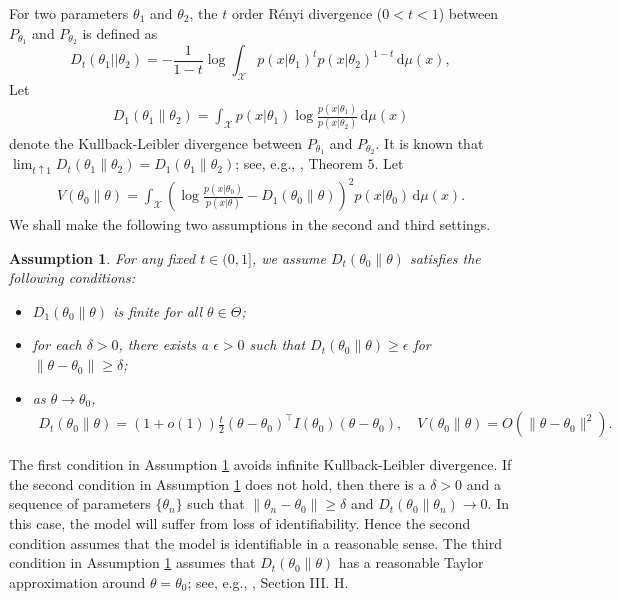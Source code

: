\documentclass[11pt]{article}
\newcommand{\myT}{\intercal}
\theoremstyle{plain}
\newtheorem{assumption}{\quad\quad Assumption}
\theoremstyle{definition}
\theoremstyle{remark}
\begin{document}
 For two parameters $\theta_1$ and $\theta_2$, the $t$ order R\'{e}nyi divergence ($0<t <1$) between $P_{\theta_1}$ and $P_{\theta_2}$ is defined as
$$
D_{t}(\theta_1||\theta_2)=-\frac{1}{1-t}\log 
\int_{\mathcal{X}} p(x|\theta_1)^{t} p(x|\theta_2)^{1-t} \, \mathrm d \mu (x)
,
$$
Let 
\begin{align*}
    D_1(\theta_1 \| \theta_2) = \int_{\mathcal X} p( x |\theta_1) \log \frac{p(x | \theta_1)} { p( x | \theta_2) } \, \mathrm d \mu (x)
\end{align*}
denote the Kullback-Leibler divergence between $P_{\theta_1}$ and $P_{\theta_2}$.
It is known that $\lim_{t \uparrow 1} D_t(\theta_1 \| \theta_2) = D_1 (\theta_1 \| \theta_2)$; see, e.g., \cite{Erven2014}, Theorem $5$.
Let 
\begin{align*}
    V(\theta_0 \| \theta) = \int_{\mathcal X} \left( \log \frac{p(x|\theta_0)} { p(x | \theta) }  - D_1 (\theta_0 \| \theta) \right)^2  p( x |\theta_0) \, \mathrm d \mu (x).
\end{align*}
We shall make the following two assumptions in the second and third settings.
\begin{assumption}
    For any fixed $t \in (0,1]$,
    we assume $D_t\left( \theta_0 \| \theta \right)$ satisfies the following conditions:
    \begin{itemize}
        \item 
    $D_1(\theta_0 \| \theta)$ is finite for all $\theta \in \Theta$;
\item
    for each $\delta >0$,
    there exists a $\epsilon>0$ such that $D_t\left( \theta_0 \| \theta \right)\geq \epsilon$ for $\|\theta-\theta_0\| \geq \delta$;
\item
    as $\theta \to \theta_0$, 
    \begin{align*}
        D_t(\theta_0 \| \theta) = (1+o(1))\frac{t}{2} (\theta -\theta_0)^\myT I(\theta_0) (\theta - \theta_0),\quad
        V(\theta_0 \| \theta ) = O\left( \|\theta - \theta_0\|^2 \right)
        .
    \end{align*}
    \end{itemize}
    \label{assumption2019}
\end{assumption}
    The first condition in Assumption \ref{assumption2019} avoids infinite Kullback-Leibler divergence.
If the second condition in Assumption \ref{assumption2019} does not hold, then there is a $\delta>0$ and a sequence of parameters $\{\theta_n\}$ such that $\|\theta_n - \theta_0\| \geq \delta$ and $D_t(\theta_0 \| \theta_n ) \to 0  $.
In this case, the model will suffer from loss of identifiability.
Hence the second condition assumes that the model is identifiable in a reasonable sense.
The third condition in Assumption \ref{assumption2019} assumes that $D_t(\theta_0 \| \theta)$ has a reasonable Taylor approximation around $\theta =\theta_0$; see, e.g., \cite{Erven2014}, Section III. H.
\end{document}
